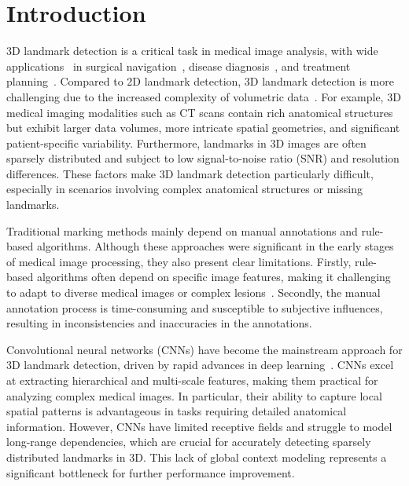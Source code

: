 \section{Introduction}
3D landmark detection is a critical task in medical image analysis, with wide applications~\cite{landmarkdetection1,king-landmark1, king-landmark2, treatment, huang2024retigan, shao2023diffuseexpand, king-medical1, MP-seg5} in surgical navigation~\cite{king1-naviga}, disease diagnosis~\cite{MP-diag1, MP-diag2, MP-diag3}, and treatment planning~\cite{MP-plan1}. Compared to 2D landmark detection, 3D landmark detection is more challenging due to the increased complexity of volumetric data~\cite{3dlandmark1, 3dlandmark2, 3dlandmark3}. For example, 3D medical imaging modalities such as CT scans contain rich anatomical structures but exhibit larger data volumes, more intricate spatial geometries, and significant patient-specific variability. Furthermore, landmarks in 3D images are often sparsely distributed and subject to low signal-to-noise ratio (SNR) and resolution differences. These factors make 3D landmark detection particularly difficult, especially in scenarios involving complex anatomical structures or missing landmarks.

Traditional marking methods mainly depend on manual annotations and rule-based algorithms. Although these approaches were significant in the early stages of medical image processing, they also present clear limitations. Firstly, rule-based algorithms often depend on specific image features, making it challenging to adapt to diverse medical images or complex lesions~\cite{handcrafted1,handcrafted2,handcrafted3}. Secondly, the manual annotation process is time-consuming and susceptible to subjective influences, resulting in inconsistencies and inaccuracies in the annotations.

Convolutional neural networks (CNNs) have become the mainstream approach for 3D landmark detection, driven by rapid advances in deep learning~\cite{CNN1, CNN2, oNeil, SCN, FARNet, 3D-CNN1-anchor, 3D-CNN2-sr, 3D-CNN3}. CNNs excel at extracting hierarchical and multi-scale features, making them practical for analyzing complex medical images. In particular, their ability to capture local spatial patterns is advantageous in tasks requiring detailed anatomical information. However, CNNs have limited receptive fields and struggle to model long-range dependencies, which are crucial for accurately detecting sparsely distributed landmarks in 3D. This lack of global context modeling represents a significant bottleneck for further performance improvement.

